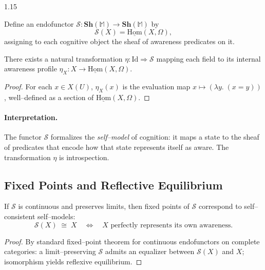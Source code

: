 \documentclass[12pt,a4paper]{article}
\begin{document}
\begin{spacing}{1.15}
\begin{definition}
\label{def:self}
Define an endofunctor
\(\mathcal{S} : \mathbf{Sh}(\mathbb{M}) \to \mathbf{Sh}(\mathbb{M})\)
by
\[
  \mathcal{S}(X) = \underline{\mathrm{Hom}}(X,\Omega),
\]
assigning to each cognitive object the sheaf of awareness predicates on it.
\end{definition}

\begin{proposition}[Reflexivity]
\label{prop:reflex}
There exists a natural transformation
\(\eta : \mathrm{Id} \Rightarrow \mathcal{S}\)
mapping each field to its internal awareness profile
\(\eta_X : X \to \underline{\mathrm{Hom}}(X,\Omega)\).
\end{proposition}

\begin{proof}
For each \(x\in X(U)\),
\(\eta_X(x)\) is the evaluation map
\(x\mapsto(\lambda y.\; (x=y))\),
well–defined as a section of \(\underline{\mathrm{Hom}}(X,\Omega)\).
\end{proof}

\paragraph{Interpretation.}
The functor \(\mathcal{S}\) formalizes
the \emph{self–model} of cognition:
it maps a state to the sheaf of predicates
that encode how that state represents itself as aware.
The transformation \(\eta\) is introspection.

\subsection{Fixed Points and Reflective Equilibrium}

\begin{theorem}
\label{thm:reflective}
If \(\mathcal{S}\) is continuous and preserves limits,
then fixed points of \(\mathcal{S}\)
correspond to self–consistent self–models:
\[
  \mathcal{S}(X) \;\cong\; X
  \quad \Leftrightarrow \quad
  X \text{ perfectly represents its own awareness.}
\]
\end{theorem}

\begin{proof}
By standard fixed–point theorem for continuous endofunctors on complete categories:
a limit–preserving \(\mathcal{S}\) admits an equalizer between
\(\mathcal{S}(X)\) and \(X\);
isomorphism yields reflexive equilibrium.
\end{proof}


\end{spacing}
\end{document}
